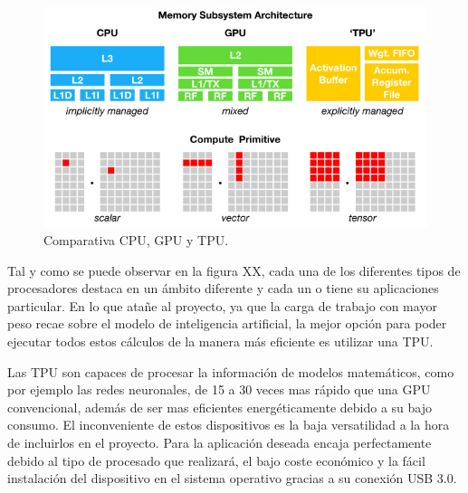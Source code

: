 \begin{figure}[h]
    \centering
    \includegraphics[scale=0.5]{fig/tpuVScpu.png}
    \caption{Comparativa CPU, GPU y TPU.}
    \label{fig:mesh1}
\end{figure}

Tal y como se puede observar en la figura XX, cada una de los diferentes tipos de procesadores destaca en un ámbito diferente y cada un o tiene su aplicaciones particular. En lo que atañe al proyecto, ya que la carga de trabajo con mayor peso recae sobre el modelo de inteligencia artificial, la mejor opción para poder ejecutar todos estos cálculos de la manera más eficiente es utilizar una TPU.

Las TPU son capaces de procesar la información de modelos matemáticos, como por ejemplo las redes neuronales, de 15 a 30 veces mas rápido que una GPU convencional, además de ser mas eficientes energéticamente debido a su bajo consumo. El inconveniente de estos dispositivos es la baja versatilidad a la hora de incluirlos en el proyecto. Para la aplicación deseada encaja perfectamente debido al tipo de procesado que realizará, el bajo coste económico y la fácil instalación del dispositivo en el sistema operativo gracias a su conexión USB 3.0. 

